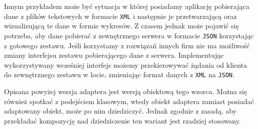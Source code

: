 


Innym przykładem może być sytuacja w której posiadamy aplikację pobierająca dane z plików tekstowych w formacie \texttt{XML} i następnie je przetwarzającą oraz wizualizującą te dane w formie wykresów. Z czasem jednak może pojawić się potrzeba, aby dane pobierać z zewnętrznego serwera w formacie \texttt{JSON} korzystając z gotowego zestawu. Jeśli korzystamy z rozwiązań innych firm nie ma możliwość zmiany interfejsu zestawu pobierającego dane z serwera. Implementując wykorzystywany wcześniej interfejs możemy przekierowywać żądania od klienta do zewnętrznego zestawu w locie, zmieniając format danych z \texttt{XML} na \texttt{JSON}.

Opisana powyżej wersja adaptera jest wersją obiektową tego wzorca. Można się również spotkać z podejściem klasowym, wtedy obiekt adaptera zamiast posiadać adaptowany obiekt, może po nim dziedziczyć. Jednak zgodnie z zasadą, aby przekładać kompozycję nad dziedziczenie ten wariant jest rzadziej stosowany. 


